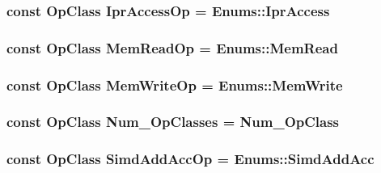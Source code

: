 \label{op__class_8hh_ae50ef4669f1d2743a6a3f6a104817cbc}
\hypertarget{op__class_8hh_ac80bed777f628f12af60cdffceadde03}{
\subsubsection[{IprAccessOp}]{\setlength{\rightskip}{0pt plus 5cm}const OpClass {\bf IprAccessOp} = Enums::IprAccess}}
\label{op__class_8hh_ac80bed777f628f12af60cdffceadde03}
\hypertarget{op__class_8hh_a35573d4080505e2c0ace9f443cddaeee}{
\subsubsection[{MemReadOp}]{\setlength{\rightskip}{0pt plus 5cm}const OpClass {\bf MemReadOp} = Enums::MemRead}}
\label{op__class_8hh_a35573d4080505e2c0ace9f443cddaeee}
\hypertarget{op__class_8hh_a2b93816d13467d4afd38a53c8c11d950}{
\subsubsection[{MemWriteOp}]{\setlength{\rightskip}{0pt plus 5cm}const OpClass {\bf MemWriteOp} = Enums::MemWrite}}
\label{op__class_8hh_a2b93816d13467d4afd38a53c8c11d950}
\hypertarget{op__class_8hh_a5e0e351c8afca390ef0a05a7dbb68b1b}{
\subsubsection[{Num\_\-OpClasses}]{\setlength{\rightskip}{0pt plus 5cm}const OpClass {\bf Num\_\-OpClasses} = Num\_\-OpClass}}
\label{op__class_8hh_a5e0e351c8afca390ef0a05a7dbb68b1b}
\hypertarget{op__class_8hh_aafe77005165f9045b7b7bf43400de080}{
\subsubsection[{SimdAddAccOp}]{\setlength{\rightskip}{0pt plus 5cm}const OpClass {\bf SimdAddAccOp} = Enums::SimdAddAcc}}
